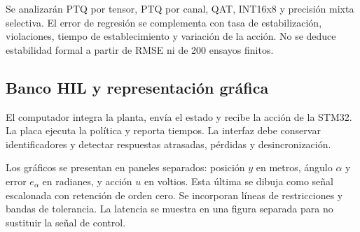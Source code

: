 Se analizarán PTQ por tensor, PTQ por canal, QAT, INT16x8 y precisión mixta selectiva. El error de regresión se complementa con tasa de estabilización, violaciones, tiempo de establecimiento y variación de la acción. No se deduce estabilidad formal a partir de RMSE ni de 200 ensayos finitos.

\subsection{Banco HIL y representación gráfica}
El computador integra la planta, envía el estado y recibe la acción de la STM32. La placa ejecuta la política y reporta tiempos. La interfaz debe conservar identificadores y detectar respuestas atrasadas, pérdidas y desincronización.

Los gráficos se presentan en paneles separados: posición $y$ en metros, ángulo $\alpha$ y error $e_\alpha$ en radianes, y acción $u$ en voltios. Esta última se dibuja como señal escalonada con retención de orden cero. Se incorporan líneas de restricciones y bandas de tolerancia. La latencia se muestra en una figura separada para no sustituir la señal de control.
